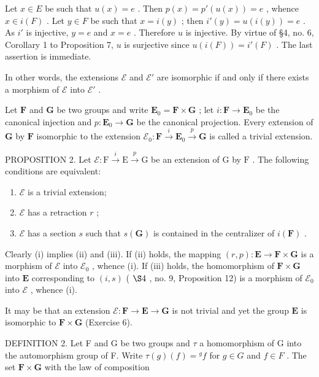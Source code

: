 Let \(x \in E\) be such that \(u(x) = e\) . Then \(p(x) = p'(u(x)) = e\) , whence \(x \in i(F)\) . Let \(y \in F\) be such that \(x = i(y)\) ; then \(i'(y) = u(i(y)) = e\) . As \(i'\) is injective, \(y = e\) and \(x = e\) . Therefore \(u\) is injective. By virtue of §4, no. 6, Corollary 1 to Proposition 7, \(u\) is surjective since \(u(i(F)) = i'(F)\) . The last assertion is immediate.

In other words, the extensions \(\mathcal{E}\) and \(\mathcal{E}'\) are isomorphic if and only if there exists a morphism of \(\mathcal{E}\) into \(\mathcal{E}'\) .

Let \(\mathbf{F}\) and \(\mathbf{G}\) be two groups and write \(\mathbf{E}_0 = \mathbf{F} \times \mathbf{G}\) ; let \(i: \mathbf{F} \to \mathbf{E}_0\) be the canonical injection and \(p: \mathbf{E}_0 \to \mathbf{G}\) be the canonical projection. Every extension of \(\mathbf{G}\) by \(\mathbf{F}\) isomorphic to the extension \(\mathcal{E}_0: \mathbf{F} \xrightarrow{i} \mathbf{E}_0 \xrightarrow{p} \mathbf{G}\) is called a trivial extension.

PROPOSITION 2. Let \(\mathcal{E}:\mathrm{F}\xrightarrow{i}\mathrm{E}\xrightarrow{p}\mathrm{G}\) be an extension of \(\mathrm{G}\) by \(\mathrm{F}\) . The following conditions are equivalent:

\begin{enumerate}
\def\labelenumi{(\roman{enumi})}
\item
  \(\mathcal{E}\) is a trivial extension;
\item
  \(\mathcal{E}\) has a retraction \(r\) ;
\item
  \(\mathcal{E}\) has a section \(s\) such that \(s(\mathbf{G})\) is contained in the centralizer of \(i(\mathbf{F})\) .
\end{enumerate}

Clearly (i) implies (ii) and (iii). If (ii) holds, the mapping \((r, p): \mathbf{E} \to \mathbf{F} \times \mathbf{G}\) is a morphism of \(\mathcal{E}\) into \(\mathcal{E}_0\) , whence (i). If (iii) holds, the homomorphism of \(\mathbf{F} \times \mathbf{G}\) into \(\mathbf{E}\) corresponding to \((i, s)\) ( \(\S 4\) , no. 9, Proposition 12) is a morphism of \(\mathcal{E}_0\) into \(\mathcal{E}\) , whence (i).

It may be that an extension \(\mathcal{E}:\mathbf{F}\to\mathbf{E}\to\mathbf{G}\) is not trivial and yet the group \(\mathbf{E}\) is isomorphic to \(\mathbf{F}\times\mathbf{G}\) (Exercise 6).

DEFINITION 2. Let F and G be two groups and \(\tau\) a homomorphism of G into the automorphism group of F. Write \(\tau(g)(f) = {}^g f\) for \(g \in G\) and \(f \in F\) . The set \(\mathbf{F} \times \mathbf{G}\) with the law of composition

